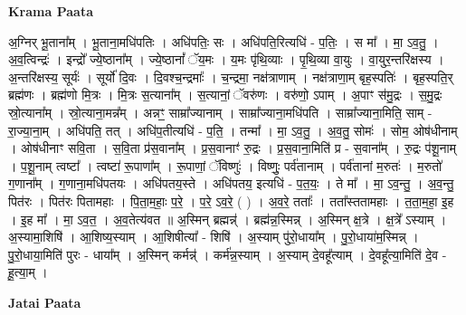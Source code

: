 \documentclass[17pt]{extarticle}
\begin{document}
\textbf{Krama Paata} \newline

अ॒ग्निर् भू॒ताना᳚म् । भू॒ताना॒मधि॑पतिः । अधि॑पतिः॒ सः । अधि॑पति॒रित्यधि॑ - प॒तिः॒ । स मा᳚ । मा॒ ऽव॒तु॒ । अ॒व॒त्विन्द्रः॑ । इन्द्रो᳚ ज्ये॒ष्ठाना᳚म् । ज्ये॒ष्ठानां᳚ ॅय॒मः । य॒मः पृ॑थि॒व्याः । पृ॒थि॒व्या वा॒युः । वा॒युर॒न्तरि॑क्षस्य । अ॒न्तरि॑क्षस्य॒ सूर्यः॑ । सूर्यो॑ दि॒वः । दि॒वश्च॒न्द्रमाः᳚ । च॒न्द्रमा॒ नक्ष॑त्राणाम् । नक्ष॑त्राणा॒म् बृह॒स्पतिः॑ । बृह॒स्पति॒र् ब्रह्म॑णः । ब्रह्म॑णो मि॒त्रः । मि॒त्रः स॒त्याना᳚म् । स॒त्यानां॒ ॅवरु॑णः । वरु॑णो॒ ऽपाम् । अ॒पाꣳ स॑मु॒द्रः । स॒मु॒द्रः स्रो॒त्याना᳚म् । स्रो॒त्याना॒मन्न᳚म् । अन्नꣳ॒॒ साम्रा᳚ज्यानाम् । साम्रा᳚ज्याना॒मधि॑पति । साम्रा᳚ज्याना॒मिति॒ साम् - रा॒ज्या॒ना॒म् । अधि॑पति॒ तत् । अधि॑प॒तीत्यधि॑ - प॒ति॒ । तन्मा᳚ । मा॒ ऽव॒तु॒ । अ॒व॒तु॒ सोमः॑ । सोम॒ ओष॑धीनाम् । ओष॑धीनाꣳ सवि॒ता । स॒वि॒ता प्र॑स॒वाना᳚म् । प्र॒स॒वानाꣳ॑ रु॒द्रः । प्र॒स॒वाना॒मिति॑ प्र - स॒वाना᳚म् । रु॒द्रः प॑शू॒नाम् । प॒शू॒नाम् त्वष्टा᳚ । त्वष्टा॑ रू॒पाणा᳚म् । रू॒पाणां॒ ॅविष्णुः॑ । विष्णुः॒ पर्व॑तानाम् । पर्व॑तानां म॒रुतः॑ । म॒रुतो॑ ग॒णाना᳚म् । ग॒णाना॒मधि॑पतयः । 
अधि॑पतय॒स्ते । अधि॑पतय॒ इत्यधि॑ - प॒त॒यः॒ । ते मा᳚ । 
मा॒ ऽव॒न्तु॒ । अ॒व॒न्तु॒ पित॑रः । पित॑रः पितामहाः । पि॒ता॒म॒हाः॒ प॒रे॒ । प॒रे॒ ऽव॒रे॒ ( ) । अ॒व॒रे॒ तताः᳚ । तता᳚स्ततामहाः । त॒ता॒म॒हा॒ इ॒ह । इ॒ह मा᳚ । मा॒ ऽव॒त॒ । अ॒व॒तेत्य॑वत ॥ अ॒स्मिन् ब्रह्मन्न्॑ । ब्रह्म॑न्न॒स्मिन्न् । अ॒स्मिन् क्ष॒त्रे । क्ष॒त्रे᳚ ऽस्याम् । अ॒स्यामा॒शिषि॑ । आ॒शिष्य॒स्याम् । आ॒शिषीत्या᳚ - शिषि॑ । अ॒स्याम् पु॑रो॒धाया᳚म् । पु॒रो॒धाया॑म॒स्मिन्न् । पु॒रो॒धाया॒मिति॑ पुरः - धाया᳚म् । अ॒स्मिन् कर्मन्न्॑ । कर्म॑न्न॒स्याम् । अ॒स्याम् दे॒वहू᳚त्याम् । दे॒वहू᳚त्या॒मिति॑ दे॒व - हू॒त्या॒म् । \newline

\textbf{Jatai Paata} \newline
\end{document}
